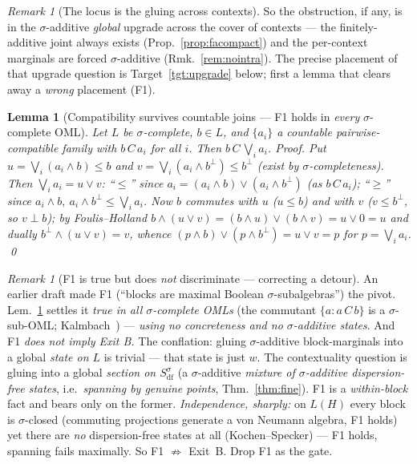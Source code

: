 \documentclass[11pt]{article}
\newtheorem{lemma}[theorem]{Lemma}
\theoremstyle{definition}
\theoremstyle{remark}
\newtheorem{remark}[theorem]{Remark}
\newcommand{\df}{\mathrm{df}}            %
\begin{document}
\begin{remark}[The locus is the gluing across contexts]\label{rem:gluinglocus}
So the obstruction, if any, is in the $\sigma$-additive \emph{global} upgrade across
the cover of contexts --- the finitely-additive joint always exists
(Prop.~\ref{prop:facompact}) and the per-context marginals are forced
$\sigma$-additive (Rmk.~\ref{rem:nointra}). The precise placement of that upgrade
question is Target~\ref{tgt:upgrade} below; first a lemma that clears away a
\emph{wrong} placement (F1).
\end{remark}

\begin{lemma}[Compatibility survives countable joins --- F1 holds in \emph{every} $\sigma$-complete OML]\label{lem:F1}
Let $L$ be $\sigma$-complete, $b\in L$, and $\{a_i\}$ a countable pairwise-compatible
family with $b\,C\,a_i$ for all $i$. Then $b\,C\,\bigvee_i a_i$. \emph{Proof.} Put
$u=\bigvee_i(a_i\wedge b)\le b$ and $v=\bigvee_i(a_i\wedge b^{\perp})\le b^{\perp}$
(exist by $\sigma$-completeness). Then $\bigvee_i a_i=u\vee v$: ``$\le$'' since
$a_i=(a_i\wedge b)\vee(a_i\wedge b^{\perp})$ (as $b\,C\,a_i$); ``$\ge$'' since
$a_i\wedge b,\ a_i\wedge b^{\perp}\le\bigvee_i a_i$. Now $b$ commutes with $u$
($u\le b$) and with $v$ ($v\le b^{\perp}$, so $v\perp b$); by Foulis--Holland
$b\wedge(u\vee v)=(b\wedge u)\vee(b\wedge v)=u\vee 0=u$ and dually
$b^{\perp}\wedge(u\vee v)=v$, whence $(p\wedge b)\vee(p\wedge b^{\perp})=u\vee v=p$
for $p=\bigvee_i a_i$. \qed
\end{lemma}

\begin{remark}[F1 is true but does \emph{not} discriminate --- correcting a detour]\label{rem:F1notgate}
An earlier draft made F1 (``blocks are maximal Boolean $\sigma$-subalgebras'') the
pivot. Lem.~\ref{lem:F1} settles it \emph{true in all $\sigma$-complete OMLs} (the
commutant $\{a:a\,C\,b\}$ is a $\sigma$-sub-OML; Kalmbach~\cite{Kalmbach1983}) ---
\emph{using no concreteness and no $\sigma$-additive states}. And F1 \emph{does not
imply Exit B.} The conflation: gluing $\sigma$-additive block-marginals into a global
\emph{state on $L$} is trivial --- that state is just $w$. The contextuality question
is gluing into a global \emph{section on $S_{\df}^{\sigma}$} (a $\sigma$-additive
\emph{mixture of $\sigma$-additive dispersion-free states}, i.e.\ \emph{spanning by
genuine points}, Thm.~\ref{thm:fine}). F1 is a \emph{within-block} fact and bears
only on the former. \emph{Independence,
sharply:} on $L(H)$ every block is $\sigma$-closed (commuting projections generate a
von Neumann algebra, F1 holds) yet there are \emph{no} dispersion-free states at all
(Kochen--Specker) --- F1 holds, spanning fails maximally. So F1 $\not\Rightarrow$
Exit~B. Drop F1 as the gate.
\end{remark}
\end{document}
